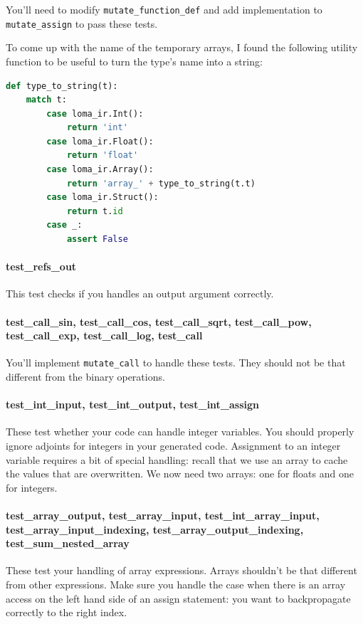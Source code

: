You'll need to modify \lstinline{mutate_function_def} and add implementation to \lstinline{mutate_assign} to pass these tests.

To come up with the name of the temporary arrays, I found the following utility function to be useful to turn the type's name into a string:
\begin{lstlisting}[language=Python]
def type_to_string(t):
    match t:
        case loma_ir.Int():
            return 'int'
        case loma_ir.Float():
            return 'float'
        case loma_ir.Array():
            return 'array_' + type_to_string(t.t)
        case loma_ir.Struct():
            return t.id
        case _:
            assert False
\end{lstlisting}

\paragraph{test_refs_out} This test checks if you handles an output argument correctly.

\paragraph{test_call_sin, test_call_cos, test_call_sqrt, test_call_pow, test_call_exp, test_call_log, test_call} You'll implement \lstinline{mutate_call} to handle these tests. They should not be that different from the binary operations.

\paragraph{test_int_input, test_int_output, test_int_assign} These test whether your code can handle integer variables. You should properly ignore adjoints for integers in your generated code. Assignment to an integer variable requires a bit of special handling: recall that we use an array to cache the values that are overwritten. We now need two arrays: one for floats and one for integers.

\paragraph{test_array_output, test_array_input, test_int_array_input, test_array_input_indexing, test_array_output_indexing, test_sum_nested_array} These test your handling of array expressions. Arrays shouldn't be that different from other expressions. Make sure you handle the case when there is an array access on the left hand side of an assign statement: you want to backpropagate correctly to the right index.

